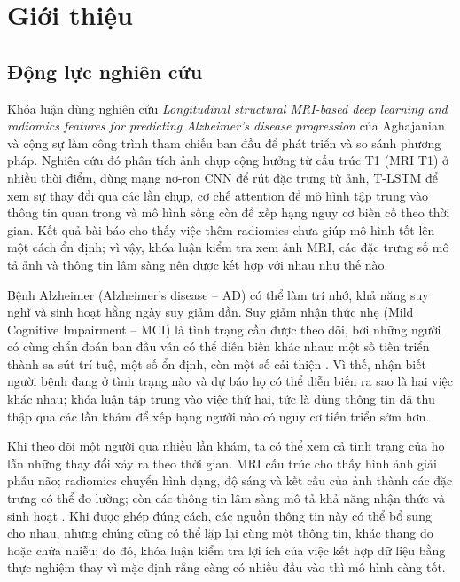 \chapter{Giới thiệu}
\label{chap:intro}

\section{Động lực nghiên cứu}
Khóa luận dùng nghiên cứu \emph{Longitudinal structural MRI-based deep learning and radiomics features for predicting Alzheimer's disease progression} của Aghajanian và cộng sự \cite{aghajanian2025longitudinal} làm công trình tham chiếu ban đầu để phát triển và so sánh phương pháp. Nghiên cứu đó phân tích ảnh chụp cộng hưởng từ cấu trúc T1 (MRI T1) ở nhiều thời điểm, dùng mạng nơ-ron CNN để rút đặc trưng từ ảnh, T-LSTM để xem sự thay đổi qua các lần chụp, cơ chế attention để mô hình tập trung vào thông tin quan trọng và mô hình sống còn để xếp hạng nguy cơ biến cố theo thời gian. Kết quả bài báo cho thấy việc thêm radiomics chưa giúp mô hình tốt lên một cách ổn định; vì vậy, khóa luận kiểm tra xem ảnh MRI, các đặc trưng số mô tả ảnh và thông tin lâm sàng nên được kết hợp với nhau như thế nào.

Bệnh Alzheimer (Alzheimer's disease -- AD) có thể làm trí nhớ, khả năng suy nghĩ và sinh hoạt hằng ngày suy giảm dần. Suy giảm nhận thức nhẹ (Mild Cognitive Impairment -- MCI) là tình trạng cần được theo dõi, bởi những người có cùng chẩn đoán ban đầu vẫn có thể diễn biến khác nhau: một số tiến triển thành sa sút trí tuệ, một số ổn định, còn một số cải thiện \cite{petersen2018mci,jack2018niaaa}. Vì thế, nhận biết người bệnh đang ở tình trạng nào và dự báo họ có thể diễn biến ra sao là hai việc khác nhau; khóa luận tập trung vào việc thứ hai, tức là dùng thông tin đã thu thập qua các lần khám để xếp hạng người nào có nguy cơ tiến triển sớm hơn.

Khi theo dõi một người qua nhiều lần khám, ta có thể xem cả tình trạng của họ lẫn những thay đổi xảy ra theo thời gian. MRI cấu trúc cho thấy hình ảnh giải phẫu não; radiomics chuyển hình dạng, độ sáng và kết cấu của ảnh thành các đặc trưng có thể đo lường; còn các thông tin lâm sàng mô tả khả năng nhận thức và sinh hoạt \cite{vangriethuysen2017computational}. Khi được ghép đúng cách, các nguồn thông tin này có thể bổ sung cho nhau, nhưng chúng cũng có thể lặp lại cùng một thông tin, khác thang đo hoặc chứa nhiễu; do đó, khóa luận kiểm tra lợi ích của việc kết hợp dữ liệu bằng thực nghiệm thay vì mặc định rằng càng có nhiều đầu vào thì mô hình càng tốt.

